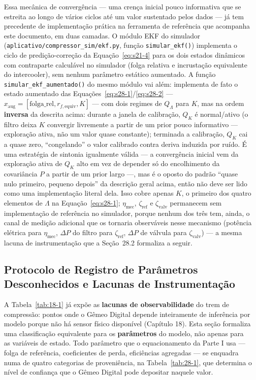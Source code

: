 \documentclass[12pt,a4paper]{article}
\numberwithin{equation}{section}
\numberwithin{table}{section}
\numberwithin{figure}{section}
\begin{document}
Essa mecânica de convergência — uma crença inicial pouco informativa que se estreita ao longo de vários ciclos até um valor sustentado pelos dados — já tem precedente de implementação prática na ferramenta de referência que acompanha este documento, em duas camadas. O módulo EKF do simulador (\texttt{aplicativo/compressor\_sim/ekf.py}, função \texttt{simular\_ekf()}) implementa o ciclo de predição-correção da Equação~\eqref{eq:s21-4} para os dois estados dinâmicos com contraparte calculável no simulador (folga relativa e incrustação equivalente do intercooler), sem nenhum parâmetro estático aumentado. A função \texttt{simular\_ekf\_aumentado()} do mesmo módulo vai além: implementa de fato o estado aumentado das Equações~\eqref{eq:s28-1}/\eqref{eq:s28-2} — $x_{\text{aug}} = [\text{folga\_rel}, r_{f,\text{equiv}}, K]$ — com dois regimes de $Q_\Lambda$ para $K$, mas na ordem \textbf{inversa} da descrita acima: durante a janela de calibração, $Q_K$ é normal/ativo (o filtro deixa $K$ convergir livremente a partir de um prior pouco informativo — exploração ativa, não um valor quase constante); terminada a calibração, $Q_K$ cai a quase zero, ``congelando'' o valor calibrado contra deriva induzida por ruído. É uma estratégia de sintonia igualmente válida — a convergência inicial vem da exploração ativa de $Q_K$ alto em vez de depender só do encolhimento da covariância $P$ a partir de um prior largo —, mas é o oposto do padrão ``quase nulo primeiro, pequeno depois'' da descrição geral acima, então não deve ser lido como uma implementação literal dela. Isso cobre apenas $K$, o primeiro dos quatro elementos de $\Lambda$ na Equação~\eqref{eq:s28-1}; $\eta_{\text{mec}}$, $\zeta_{\text{ref}}$ e $\zeta_{\text{valv}}$ permanecem sem implementação de referência no simulador, porque nenhum dos três tem, ainda, o canal de medição adicional que os tornaria observáveis nesse mecanismo (potência elétrica para $\eta_{\text{mec}}$, $\Delta P$ do filtro para $\zeta_{\text{ref}}$, $\Delta P$ de válvula para $\zeta_{\text{valv}}$) — a mesma lacuna de instrumentação que a Seção~28.2 formaliza a seguir.

\subsection{Protocolo de Registro de Parâmetros Desconhecidos e Lacunas de Instrumentação}

A Tabela~\ref{tab:18-1} já expõe as \textbf{lacunas de observabilidade} do trem de compressão: pontos onde o Gêmeo Digital depende inteiramente de inferência por modelo porque não há sensor físico disponível (Capítulo 18). Esta seção formaliza uma classificação equivalente para os \textbf{parâmetros} do modelo, não apenas para as variáveis de estado. Todo parâmetro que o equacionamento da Parte I usa — folga de referência, coeficientes de perda, eficiências agregadas — se enquadra numa de quatro categorias de proveniência, na Tabela~\ref{tab:28-1}, que determina o nível de confiança que o Gêmeo Digital pode depositar naquele valor.
\end{document}
